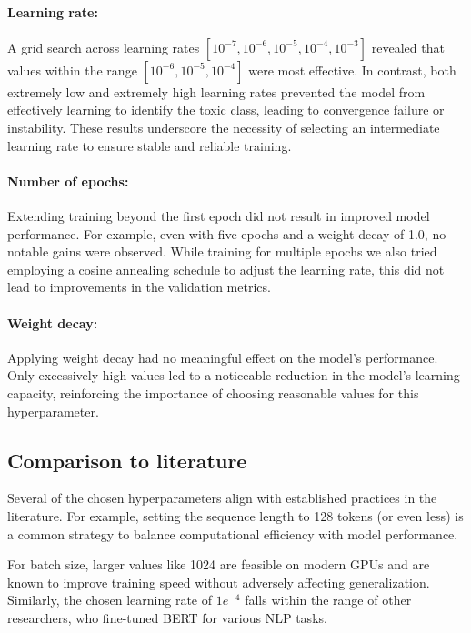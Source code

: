 \paragraph{Learning rate:} A grid search across learning rates \([10^{-7}, 10^{-6}, 10^{-5}, 10^{-4}, 10^{-3}]\) revealed that values within the range \([10^{-6}, 10^{-5}, 10^{-4}]\) were most effective. In contrast, both extremely low and extremely high learning rates prevented the model from effectively learning to identify the toxic class, leading to convergence failure or instability. These results underscore the necessity of selecting an intermediate learning rate to ensure stable and reliable training.

\paragraph{Number of epochs:} Extending training beyond the first epoch did not result in improved model performance. For example, even with five epochs and a weight decay of 1.0, no notable gains were observed. While training for multiple epochs we also tried employing a cosine annealing schedule to adjust the learning rate, this did not lead to improvements in the validation metrics.

\paragraph{Weight decay:} Applying weight decay had no meaningful effect on the model's performance. Only excessively high values led to a noticeable reduction in the model's learning capacity, reinforcing the importance of choosing reasonable values for this hyperparameter.

\subsection{Comparison to literature}

Several of the chosen hyperparameters align with established practices in the literature. For example, setting the sequence length to 128 tokens (or even less) is a common strategy to balance computational efficiency with model performance. \cite{Zhao2021}

For batch size, larger values like 1024 are feasible on modern GPUs and are known to improve training speed without adversely affecting generalization. Similarly, the chosen learning rate of \(1e^{-4}\) falls within the range of other researchers, who fine-tuned BERT for various NLP tasks. \cite{Smith2017, Zhou2021}

